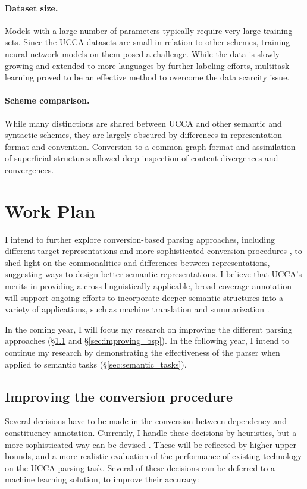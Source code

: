 \documentclass[12pt]{article}
\begin{document}
\paragraph{Dataset size.}
Models with a large number of parameters typically require very large
training sets.
Since the UCCA datasets are small in relation to other schemes,
training neural network models on them posed a challenge.
While the data is slowly growing and extended to more languages by further labeling efforts,
multitask learning proved to be an effective method to overcome the data scarcity issue.

\paragraph{Scheme comparison.}
While many distinctions are shared between UCCA and other semantic and syntactic schemes,
they are largely obscured by differences in representation format and convention.
Conversion to a common graph format and assimilation of superficial structures
allowed deep inspection of content divergences and convergences.


\section{Work Plan}\label{sec:plan}

I intend to further explore conversion-based parsing approaches,
including different target representations and more sophisticated conversion
procedures \cite{kong-15},
to shed light on the commonalities and differences between representations,
suggesting ways to design better semantic representations.
I believe that UCCA's merits in providing a cross-linguistically applicable,
broad-coverage annotation will support ongoing efforts to incorporate deeper
semantic structures into a variety of applications, such as machine translation
\cite{jones2012semantics} and summarization \cite{liu2015toward}.

In the coming year, I will focus my research on improving the different parsing approaches
(\S\ref{sec:improving_conversions} and \S\ref{sec:improving_bsp}).
In the following year, I intend to continue my research by demonstrating the effectiveness
of the parser when applied to semantic tasks (\S\ref{sec:semantic_tasks}).


\subsection{Improving the conversion procedure}\label{sec:improving_conversions}
Several decisions have to be made in the conversion between dependency and
constituency annotation.
Currently, I handle these decisions by heuristics, but a more
sophisticated way can be devised \cite{fernandez2015parsing}.
These will be reflected by higher upper bounds, and a more realistic evaluation
of the performance of existing technology on the UCCA parsing task.
Several of these decisions can be deferred to a machine learning solution,
to improve their accuracy:
\end{document}
